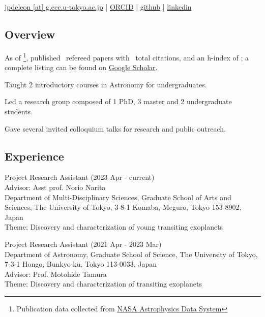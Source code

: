 \documentclass[11pt,letterpaper]{article}
\begin{document}
\thispagestyle{empty}\sloppy\sloppypar\raggedbottom

\textbf{\Large \fullname} \\[0.5ex]
\currentposition \\
\textsf{\small 
    \href{mailto:\email}{jpdeleon [at] g.ecc.u-tokyo.ac.jp} | %
    \href{\orcidurl}{ORCID} | %
    \href{\githuburl}{github} | %
    \href{\linkedinurl}{linkedin}
}\\[0.5ex]

\subsection{Overview}
\begin{list}{}{\cvlist}
    \item As of \pubsdate\footnote{Publication data collected from \href{https://ui.adsabs.harvard.edu/}{NASA Astrophysics Data System}}, published \pubsnumber\ refereed papers with \pubscitations\ total citations, and an h-index of \pubshindex; a complete listing can be found on \href{https://scholar.google.co.jp/citations?hl=en&user=_Z8ialwAAAAJ}{Google Scholar}.
    \item Taught 2 introductory courses in Astronomy for undergraduates. 
    \item Led a research group composed of 1 PhD, 3 master and 2 undergraduate students. 
    \item Gave several invited colloquium talks for research and public outreach.
\end{list}

\subsection{Experience}

\begin{list}{}{\cvlist}
    \item
        Project Research Assistant (2023 Apr - current) \\
        Advisor: Asst prof. Norio Narita \\
        Department of Multi-Disciplinary Sciences, Graduate School of Arts and Sciences, The University of Tokyo, 3-8-1 Komaba, Meguro, Tokyo 153-8902, Japan \\
        Theme: Discovery and characterization of young transiting exoplanets \\

    \item
        Project Research Assistant (2021 Apr - 2023 Mar) \\
        Department of Astronomy, Graduate School of Science, The University of Tokyo, 7-3-1 Hongo, Bunkyo-ku, Tokyo 113-0033, Japan \\
        Advisor: Prof. Motohide Tamura \\
        Theme: Discovery and characterization of transiting exoplanets \\
\end{list}
\end{document}
